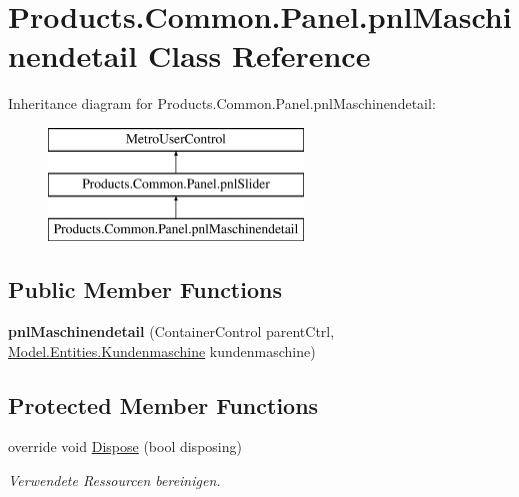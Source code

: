 \hypertarget{class_products_1_1_common_1_1_panel_1_1pnl_maschinendetail}{}\section{Products.\+Common.\+Panel.\+pnl\+Maschinendetail Class Reference}
\label{class_products_1_1_common_1_1_panel_1_1pnl_maschinendetail}
Inheritance diagram for Products.\+Common.\+Panel.\+pnl\+Maschinendetail\+:\begin{figure}[H]
\begin{center}
\leavevmode
\includegraphics[height=3.000000cm]{class_products_1_1_common_1_1_panel_1_1pnl_maschinendetail}
\end{center}
\end{figure}
\subsection*{Public Member Functions}
\begin{DoxyCompactItemize}
\item 
{\bfseries pnl\+Maschinendetail} (Container\+Control parent\+Ctrl, \hyperlink{class_products_1_1_model_1_1_entities_1_1_kundenmaschine}{Model.\+Entities.\+Kundenmaschine} kundenmaschine)\hypertarget{class_products_1_1_common_1_1_panel_1_1pnl_maschinendetail_a618556a7302008b407c0a14b92bdf752}{}\label{class_products_1_1_common_1_1_panel_1_1pnl_maschinendetail_a618556a7302008b407c0a14b92bdf752}

\end{DoxyCompactItemize}
\subsection*{Protected Member Functions}
\begin{DoxyCompactItemize}
\item 
override void \hyperlink{class_products_1_1_common_1_1_panel_1_1pnl_maschinendetail_afa8f066450d168b84cfeb37708c73bc4}{Dispose} (bool disposing)
\begin{DoxyCompactList}\small\item\em Verwendete Ressourcen bereinigen. \end{DoxyCompactList}\end{DoxyCompactItemize}
